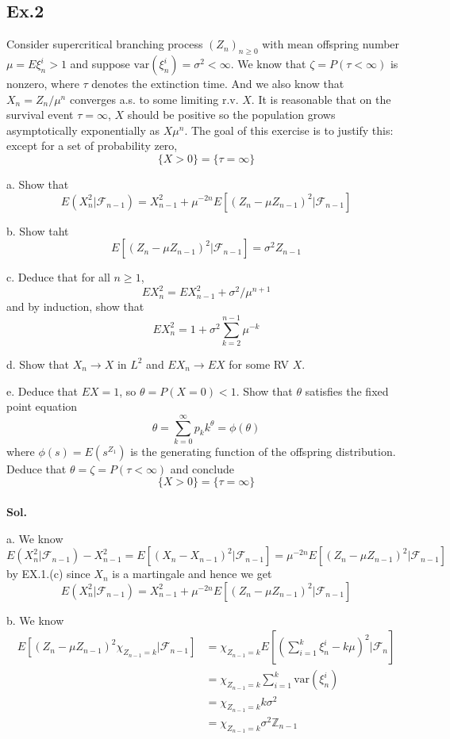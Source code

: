 \documentclass[lang=en,11pt,a4paper,citestyle =authoryear]{elegantpaper}
\newcommand{\Z}{\mathbb{Z}}
\newcommand{\F}{\mathcal{F}}
\begin{document}
\subsection*{Ex.2} 
Consider supercritical branching process $(Z_n)_{n\geq 0}$ with mean offspring number $\mu  = E\xi_n^i > 1$ and suppose $\text{var}(\xi_n^i) = \sigma^2 < \infty$. We know that $\zeta = P(\tau<\infty)$ is nonzero, where $\tau$ denotes the extinction time. And we also know that $X_n = Z_n/\mu^n$ converges a.s. to some limiting r.v. $X$. It is reasonable that on the survival event $\tau = \infty$, $X$ should be positive so the population grows asymptotically exponentially as $X\mu^n$. The goal of this exercise is to justify this: except for a set of probability zero,
\[\{X > 0\} = \{\tau = \infty\}\]\par
a. Show that
\[E(X_n^2|\F_{n-1}) = X_{n-1}^2 + \mu^{-2n}E[(Z_n - \mu Z_{n-1})^2|\F_{n-1}]\]\par
b. Show taht
\[E[(Z_n-\mu Z_{n-1})^2|\F_{n-1}] = \sigma^2 Z_{n-1}\]\par
c. Deduce that for all $n\geq 1$,
\[EX_n^2 = EX_{n-1}^2 + \sigma^2/\mu^{n+1}\]
and by induction, show that
\[EX_n^2 = 1 + \sigma^2 \sum\limits_{k=2}^{n-1}\mu^{-k}\]\par
d. Show that $X_n \to X$ in $L^2$ and $EX_n \to EX$ for some RV $X$.\par
e. Deduce that $EX = 1$, so $\theta = P(X=0)<1$. Show that $\theta$ satisfies the fixed point equation
\[\theta = \sum\limits_{k=0}^{\infty}p_kk^{\theta} = \phi(\theta)\]
where $\phi(s) = E(s^{Z_1})$ is the generating function of the offspring distribution. Deduce that $\theta = \zeta = P(\tau<\infty)$ and conclude
\[\{X > 0\} = \{\tau = \infty\}\]
\vspace{0.5em}\\
\textbf{Sol.}\par
a. We know 
\[E(X_n^2|\F_{n-1}) - X_{n-1}^2 = E[(X_n-X_{n-1})^2|\F_{n-1}] = \mu^{-2n}E[(Z_n-\mu Z_{n-1})^2|\F_{n-1}]\]
by EX.1.(c) since $X_n$ is a martingale and hence we get
\[
E(X_n^2|\F_{n-1}) = X_{n-1}^2 + \mu^{-2n}E[(Z_n - \mu Z_{n-1})^2|\F_{n-1}]
\]\par
b. We know
\[
\begin{aligned}
E[(Z_n-\mu Z_{n-1})^2\chi_{Z_{n-1} = k}|\F_{n-1}] &= \chi_{Z_{n-1} = k}E[(\sum\limits_{i=1}^k \xi_n^i - k\mu)^2|\F_n] \\ &= \chi_{Z_{n-1}=k}\sum\limits_{i=1}^k \text{var}(\xi_n^i) \\ &= \chi_{Z_{n-1} = k}k\sigma^2 \\ &= \chi_{Z_{n-1} = k}\sigma^2\Z_{n-1}
\end{aligned}
\]
\end{document}
